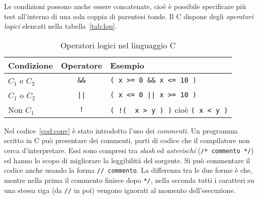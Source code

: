Le condizioni possono anche essere concatenate, cioè è possibile specificare più test all'interno di una sola coppia di parentesi tonde. Il C dispone degli \emph{operatori logici} elencati nella tabella~\vref{tab:lop}.

\begin{table}[p]
	\centering
	\caption{Operatori logici nel linguaggio C}
	\label{tab:lop}
	\begin{tabular}{lcl}
		\toprule
Condizione &Operatore &Esempio \\
		\midrule
$C_1$ e $C_2$   &\lstinline!&&! &\lstinline!( x >= 0 && x <= 10 )! \\
$C_1$ o $C_2$   &\lstinline!||!   &\lstinline!( x <= 0 || x >= 10 )! \\
Non $C_1$	       &\lstinline?!?    &\lstinline?( !(  x > y ) )? cioè \lstinline?( x < y )?\\
		\bottomrule
	\end{tabular}
\end{table}

Nel codice~\vref{cod:conv} è stato introdotto l'uso dei \emph{commenti}. Un programma scritto in C può presentare dei commenti, parti di codice che il compilatore non cerca d'interpretare. Essi sono compresi tra \emph{slash} ed \emph{asterischi} (\lstinline!/* commento */!) ed hanno lo scopo di migliorare la leggibilità del sorgente. Si può commentare il codice anche usando la forma \lstinline$// commento$. La differenza tra le due forme è che, mentre nella prima il commento finisce dopo {\color{green}\lstinline!*/!}, nella seconda tutti i caratteri su una stessa riga (da \lstinline!//! in poi) vengono ignorati al momento dell'esecuzione.

